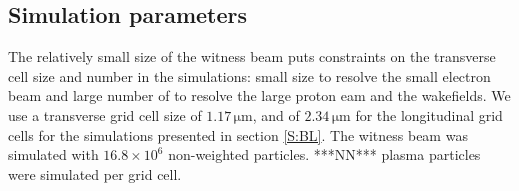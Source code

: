 \documentclass[aps,prstab,reprint,amsmath,amssymb,groupedaddress,onecolumn]{revtex4-1}
\newcommand{\unit}[1]{\,\mathrm{#1}}
\newcommand{\nexp}[1]{\times 10^{#1}}
\begin{document}


\subsection{Simulation parameters}\label{SIM}

The relatively small size of the witness beam %
puts constraints on the transverse cell size and number in the simulations: small size to resolve the small electron beam and large number of to resolve the large proton eam and the wakefields. %
We use %
a transverse grid cell size of $1.17\unit{\mu m}$, and of
$2.34\unit{\mu m}$ for the longitudinal grid cells for the simulations presented in section \ref{S:BL}. The witness beam
was simulated with $16.8\nexp{6}$ non-weighted particles.  ***NN*** plasma particles were simulated per grid cell.
\end{document}

